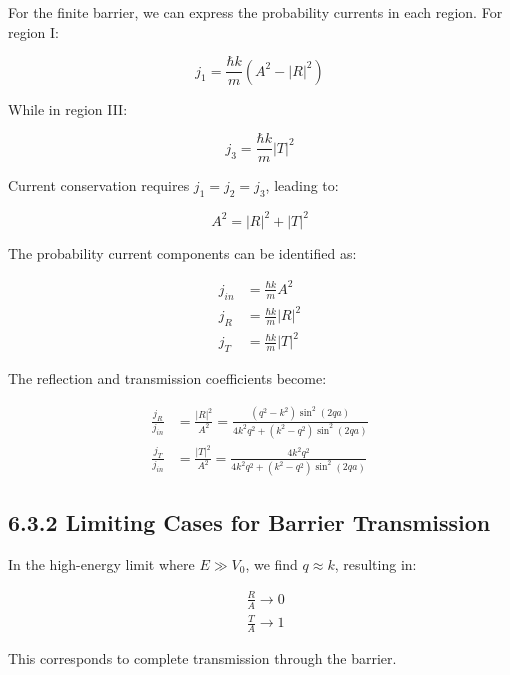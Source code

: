 \documentclass[10pt]{article}
\begin{document}
For the finite barrier, we can express the probability currents in each region. For region I:

\begin{equation*}
j_{1}=\frac{\hbar k}{m}\left(A^{2}-|R|^{2}\right) \tag{6.61}
\end{equation*}

While in region III:

\begin{equation*}
j_{3}=\frac{\hbar k}{m}|T|^{2} \tag{6.62}
\end{equation*}

Current conservation requires $j_1 = j_2 = j_3$, leading to:

\begin{equation*}
A^{2}=|R|^{2}+|T|^{2} \tag{6.63}
\end{equation*}

The probability current components can be identified as:

\begin{align*}
j_{i n} & =\frac{\hbar k}{m} A^{2} \\
j_{R} & =\frac{\hbar k}{m}|R|^{2}  \tag{6.64}\\
j_{T} & =\frac{\hbar k}{m}|T|^{2}
\end{align*}

The reflection and transmission coefficients become:

\begin{align*}
\frac{j_{R}}{j_{i n}} & =\frac{|R|^{2}}{A^{2}}=\frac{\left(q^{2}-k^{2}\right) \sin ^{2}(2 q a)}{4 k^{2} q^{2}+\left(k^{2}-q^{2}\right) \sin ^{2}(2 q a)} \\
\frac{j_{T}}{j_{i n}} & =\frac{|T|^{2}}{A^{2}}=\frac{4 k^{2} q^{2}}{4 k^{2} q^{2}+\left(k^{2}-q^{2}\right) \sin ^{2}(2 q a)} \tag{6.65}
\end{align*}

\subsection*{6.3.2 Limiting Cases for Barrier Transmission}

In the high-energy limit where $E \gg V_0$, we find $q \approx k$, resulting in:

\begin{align*}
& \frac{R}{A} \rightarrow 0 \\
& \frac{T}{A} \rightarrow 1 \tag{6.66}
\end{align*}

This corresponds to complete transmission through the barrier.
\end{document}
